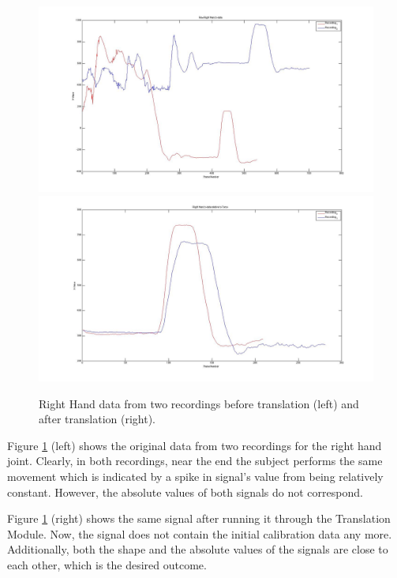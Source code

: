 \documentclass[11pt,a4paper]{article}
\begin{document}
\begin{figure}[H]
\centering
\includegraphics[scale=0.16]{Non_Translated_R_H_Data.jpg}
\includegraphics[scale=0.16]{R_H_Data_Relative_Torso.jpg}

\caption{Right Hand data from two recordings before translation (left) and after translation (right).}
\label{pre_translation_graph}
\end{figure}

\noindent
Figure \ref{pre_translation_graph} (left) shows the original data from two recordings for the right hand joint. Clearly, in both recordings, near the end the subject performs the same movement which is indicated by a spike in signal's value from being relatively constant. However, the absolute values of both signals do not correspond.
 
\noindent
Figure \ref{pre_translation_graph} (right) shows the same signal after running it through the Translation Module. Now, the signal does not contain the initial calibration data any more. Additionally, both the shape and the absolute values of the signals are close to each other, which is the desired outcome.
\end{document}
